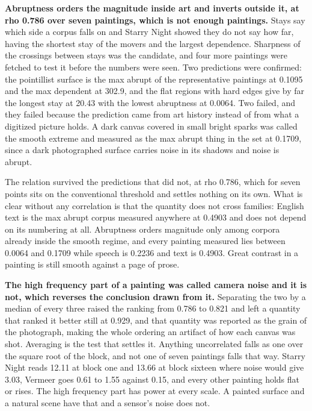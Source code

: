 \textbf{Abruptness orders the magnitude inside art and inverts outside it, at rho 0.786 over seven paintings, which is not enough paintings.} Stays say which side a corpus falls on and Starry Night showed they do not say how far, having the shortest stay of the movers and the largest dependence. Sharpness of the crossings between stays was the candidate, and four more paintings were fetched to test it before the numbers were seen. Two predictions were confirmed: the pointillist surface is the max abrupt of the representative paintings at 0.1095 and the max dependent at 302.9, and the flat regions with hard edges give by far the longest stay at 20.43 with the lowest abruptness at 0.0064. Two failed, and they failed because the prediction came from art history instead of from what a digitized picture holds. A dark canvas covered in small bright sparks was called the smooth extreme and measured as the max abrupt thing in the set at 0.1709, since a dark photographed surface carries noise in its shadows and noise is abrupt.

The relation survived the predictions that did not, at rho 0.786, which for seven points sits on the conventional threshold and settles nothing on its own. What is clear without any correlation is that the quantity does not cross families: English text is the max abrupt corpus measured anywhere at 0.4903 and does not depend on its numbering at all. Abruptness orders magnitude only among corpora already inside the smooth regime, and every painting measured lies between 0.0064 and 0.1709 while speech is 0.2236 and text is 0.4903. Great contrast in a painting is still smooth against a page of prose.

\textbf{The high frequency part of a painting was called camera noise and it is not, which reverses the conclusion drawn from it.} Separating the two by a median of every three raised the ranking from 0.786 to 0.821 and left a quantity that ranked it better still at 0.929, and that quantity was reported as the grain of the photograph, making the whole ordering an artifact of how each canvas was shot. Averaging is the test that settles it. Anything uncorrelated falls as one over the square root of the block, and not one of seven paintings falls that way. Starry Night reads 12.11 at block one and 13.66 at block sixteen where noise would give 3.03, Vermeer goes 0.61 to 1.55 against 0.15, and every other painting holds flat or rises. The high frequency part has power at every scale. A painted surface and a natural scene have that and a sensor's noise does not.

